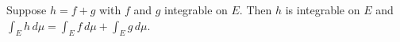 Suppose $h = f + g$ with $f$ and $g$ integrable on $E$. Then $h$ is integrable on $E$ and $\int_E h \, d\mu = \int_E f \, d\mu + \int_E g \, d\mu$.
